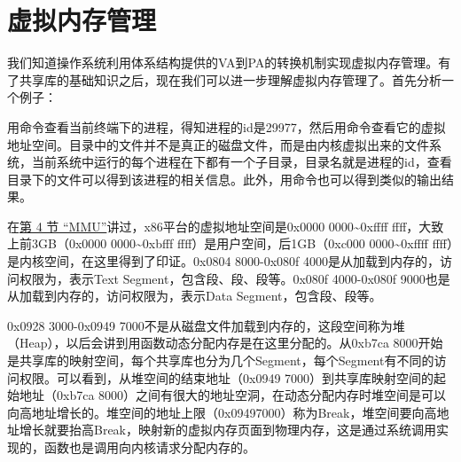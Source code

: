 



\section{虚拟内存管理}
%
我们知道操作系统利用体系结构提供的VA到PA的转换机制实现虚拟内存管理。有了共享库的基础知识之后，现在我们可以进一步理解虚拟内存管理了。首先分析一个例子：




用命令查看当前终端下的进程，得知进程的id是29977，然后用命令查看它的虚拟地址空间。目录中的文件并不是真正的磁盘文件，而是由内核虚拟出来的文件系统，当前系统中运行的每个进程在下都有一个子目录，目录名就是进程的id，查看目录下的文件可以得到该进程的相关信息。此外，用命令也可以得到类似的输出结果。




在\hyperlink{db.ch17s04.id2767055}{第 4 节 “MMU”}讲过，x86平台的虚拟地址空间是0x0000 0000\textasciitilde{}\BookSplit{}0xffff ffff，大致上前3GB（0x0000 0000\textasciitilde{}\BookSplit{}0xbfff ffff）是用户空间，后1GB（0xc000 0000\textasciitilde{}\BookSplit{}0xffff ffff）是内核空间，在这里得到了印证。0x0804 8000-0x080f 4000是从加载到内存的，访问权限为，表示Text Segment，包含段、段、段等。0x080f 4000-0x080f 9000也是从加载到内存的，访问权限为，表示Data Segment，包含段、段等。



0x0928 3000-0x0949 7000不是从磁盘文件加载到内存的，这段空间称为堆（Heap），以后会讲到用函数动态分配内存是在这里分配的。从0xb7ca 8000开始是共享库的映射空间，每个共享库也分为几个Segment，每个Segment有不同的访问权限。可以看到，从堆空间的结束地址（0x0949 7000）到共享库映射空间的起始地址（0xb7ca 8000）之间有很大的地址空洞，在动态分配内存时堆空间是可以向高地址增长的。堆空间的地址上限（0x09497000）称为Break，堆空间要向高地址增长就要抬高Break，映射新的虚拟内存页面到物理内存，这是通过系统调用实现的，函数也是调用向内核请求分配内存的。



